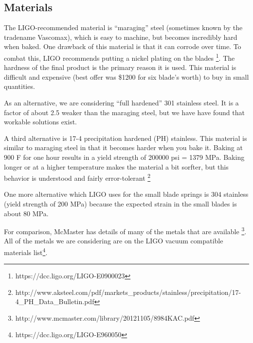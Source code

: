 

 
%
%
\subsection{Materials}

The LIGO-recommended material is ``maraging'' steel (sometimes known by the tradename Vascomax), which is easy to machine, but becomes incredibly hard when baked.  One drawback of this material is that it can corrode over time.  To combat this, LIGO recommends putting a nickel plating on the blades \footnote{https://dcc.ligo.org/LIGO-E0900023}.  The hardness of the final product is the primary reason it is used.  This material is difficult and expensive (best offer was \$1200 for six blade's worth) to buy in small quantities.  

As an alternative, we are considering ``full hardened'' 301 stainless steel.  It is a factor of about 2.5 weaker than the maraging steel, but we have have found that workable solutions exist.

A third alternative is 17-4 precipitation hardened (PH) stainless.  This material is similar to maraging steel in that it becomes harder when you bake it.  Baking at 900 F for one hour results in a yield strength of 200000 psi = 1379 MPa.  Baking longer or at a higher temperature makes the material a bit sorfter, but this behavior is understood and fairly error-tolerant \footnote{http://www.aksteel.com/pdf/markets\_products/stainless/precipitation/17-4\_PH\_Data\_Bulletin.pdf}

One more alternative which LIGO uses for the small blade springs is 304 stainless (yield strength of 200 MPa) because the expected strain in the small blades is about 80 MPa.

For comparison, McMaster has details of many of the metals that are available \footnote{http://www.mcmaster.com/library/20121105/8984KAC.pdf}. All of the metals we are considering are on the LIGO vacuum compatible materials list\footnote{https://dcc.ligo.org/LIGO-E960050}.

